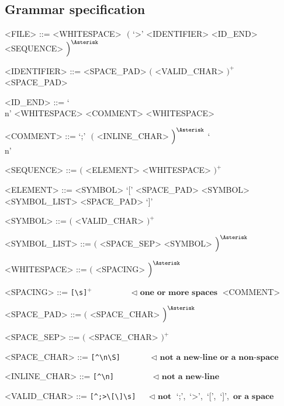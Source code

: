 \documentclass[12pt]{article}
\begin{document}
\pagebreak

\subsection{Grammar specification}

\setlength{\grammarparsep}{12pt plus 1pt minus 1pt} %
\setlength{\grammarindent}{10em} %

\begin{grammar}

  <FILE>         ::=  <WHITESPACE> $\,\,\Big($ `>' <IDENTIFIER> <ID_END> <SEQUENCE> $\Big)^{\Asterisk}$

  <IDENTIFIER>   ::=  <SPACE_PAD> $\Big($ <VALID_CHAR> $\Big)^{+}$ <SPACE_PAD>

  <ID_END>       ::=  `\\n' <WHITESPACE>
                 \alt <COMMENT> <WHITESPACE>

  <COMMENT>      ::=  `;' $\,\,\Big($ <INLINE_CHAR> $\Big)^{\Asterisk}$ `\\n'

  <SEQUENCE>     ::=  $\Big($ <ELEMENT> <WHITESPACE> $\Big)^{+}$
  
  <ELEMENT>      ::=  <SYMBOL>
                 \alt `[' <SPACE_PAD> <SYMBOL> <SYMBOL_LIST> <SPACE_PAD> `]'
 
  <SYMBOL>       ::=  $\Big($ <VALID_CHAR> $\Big)^{+}$
                 
  <SYMBOL_LIST>  ::=  $\Big($ <SPACE_SEP> <SYMBOL> $\Big)^{\Asterisk}$
  
  <WHITESPACE>   ::=  $\Big($ <SPACING> $\Big)^{\Asterisk}$

  <SPACING>      ::=  \verb![\s]!$^{+}$  $\quad\,\quad\quad\quad \lhd \,\, \textbf{one or more spaces}$
                 \alt <COMMENT>

  <SPACE_PAD>    ::=  $\Big($ <SPACE_CHAR> $\Big)^{\Asterisk}$

  <SPACE_SEP>    ::=  $\Big($ <SPACE_CHAR> $\Big)^{+}$

  <SPACE_CHAR>   ::=  \verb![^\n\S]!     $\quad\,\quad\quad      \lhd \,\, \textbf{not a new-line or a non-space}$

  <INLINE_CHAR>  ::=  \verb![^\n]!       $\quad\,\quad\quad\quad \lhd \,\, \textbf{not a new-line}$

  <VALID_CHAR>   ::=  \verb![^;>\[\]\s]! $\quad                  \lhd \,\, \textbf{not}$ `;',$\,$ `>',$\,$ `[',$\,$ `]', $\,\textbf{or a space}$


  
\end{grammar}
\end{document}
